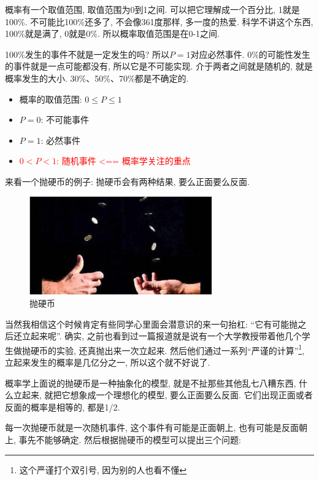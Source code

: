 概率有一个取值范围, 取值范围为0到1之间. 可以把它理解成一个百分比, 1就是100\%. 不可能比100\%还多了, 不会像361度那样, 多一度的热爱. 科学不讲这个东西, 100\%就是满了, 0就是0\%. 所以概率取值范围是在0-1之间. 

100\%发生的事件不就是一定发生的吗? 所以$P=1$对应必然事件. 0\%的可能性发生的事件就是一点可能都没有, 所以它是不可能实现. 介于两者之间就是随机的, 就是概率发生的大小. 30\%、50\%、70\%都是不确定的. 

\begin{itemize}
  \item 概率的取值范围: $0 \leq P \leq 1 $
  \item $P = 0$: 不可能事件 
  \item $P = 1$: 必然事件 
  \item \textcolor{red}{$0 < P < 1$: 随机事件 <== 概率学关注的重点}
\end{itemize}

来看一个抛硬币的例子: 抛硬币会有两种结果, 要么正面要么反面. 

\begin{figure}[ht]
  \centering
  \includegraphics[width=0.7\textwidth]{asset/28420cc4-afeb-4064-97ec-359a2ff38dee.png}
  \caption{抛硬币}
  \label{fig:img5_1}
\end{figure}

当然我相信这个时候肯定有些同学心里面会潜意识的来一句抬杠: “它有可能抛之后还立起来呢”. 确实, 之前也看到过一篇报道就是说有一个大学教授带着他几个学生做抛硬币的实验, 还真抛出来一次立起来. 然后他们通过一系列“严谨的计算”\footnote{这个严谨打个双引号, 因为别的人也看不懂}, 立起来发生的概率是几亿分之一, 所以这个就不好说了. 

概率学上面说的抛硬币是一种抽象化的模型, 就是不扯那些其他乱七八糟东西, 什么立起来, 就把它想象成一个理想化的模型, 要么正面要么反面. 它们出现正面或者反面的概率是相等的, 都是1/2. 

每一次抛硬币就是一次随机事件, 这个事件有可能是正面朝上, 也有可能是反面朝上, 事先不能够确定. 然后根据抛硬币的模型可以提出三个问题:

